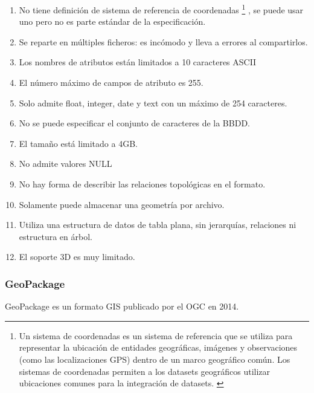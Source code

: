 \begin{enumerate} 
    \item No tiene definición de sistema de referencia de coordenadas \footnote{Un sistema de
            coordenadas es un sistema de referencia que se utiliza para representar la ubicación de entidades
            geográficas, imágenes y observaciones (como las localizaciones GPS) dentro de un marco geográfico
            común. Los sistemas de coordenadas permiten a los datasets geográficos utilizar ubicaciones comunes
            para la integración de datasets. \cite{coordenadas}} 
        , se puede usar uno pero no es parte estándar de la especificación.     
    \item Se reparte en múltiples ficheros: es incómodo y lleva a errores al compartirlos.
    \item Los nombres de atributos están limitados a 10 caracteres ASCII 
    \item El número máximo de campos de atributo es 255.  
    \item Solo admite float, integer, date y text con un máximo de 254 caracteres.  
    \item No se puede especificar el conjunto de caracteres de la BBDD.  
    \item El tamaño está limitado a 4GB.  
    \item No admite valores NULL 
    \item No hay forma de describir las relaciones topológicas en el formato.  
    \item Solamente puede almacenar una geometría por archivo.  
    \item Utiliza una estructura de datos de tabla plana, sin jerarquías, relaciones ni estructura en árbol.  
    \item El soporte 3D es muy limitado.  
\end{enumerate}

\subsubsection{GeoPackage}
GeoPackage es un formato GIS publicado por el OGC en 2014. \cite{geopackage-spec}
    
